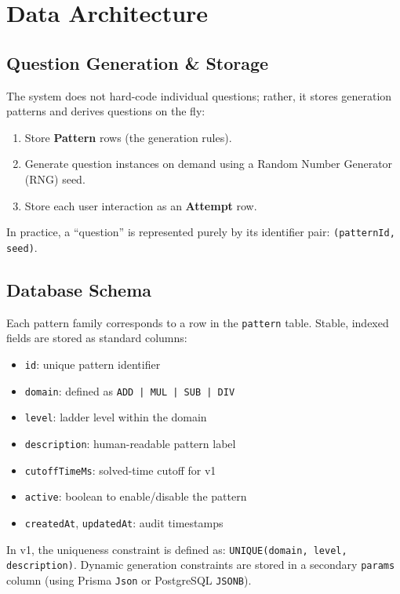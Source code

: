 \documentclass[11pt]{article}
\begin{document}
\section{Data Architecture}

\subsection{Question Generation \& Storage}
The system does not hard-code individual questions; rather, it stores generation patterns and derives questions on the fly:
\begin{enumerate}[leftmargin=*]
    \item Store \textbf{Pattern} rows (the generation rules).
    \item Generate question instances on demand using a Random Number Generator (RNG) seed.
    \item Store each user interaction as an \textbf{Attempt} row.
\end{enumerate}
In practice, a ``question'' is represented purely by its identifier pair: \texttt{(patternId, seed)}.

\subsection{Database Schema}
Each pattern family corresponds to a row in the \texttt{pattern} table. Stable, indexed fields are stored as standard columns:
\begin{itemize}[leftmargin=*]
        \item \texttt{id}: unique pattern identifier
        \item \texttt{domain}: defined as \texttt{ADD | MUL | SUB | DIV}
        \item \texttt{level}: ladder level within the domain
        \item \texttt{description}: human-readable pattern label
        \item \texttt{cutoffTimeMs}: solved-time cutoff for v1
        \item \texttt{active}: boolean to enable/disable the pattern
        \item \texttt{createdAt}, \texttt{updatedAt}: audit timestamps
\end{itemize}
In v1, the uniqueness constraint is defined as: \texttt{UNIQUE(domain, level, description)}.
Dynamic generation constraints are stored in a secondary \texttt{params} column (using Prisma \texttt{Json} or PostgreSQL \texttt{JSONB}).
\end{document}
